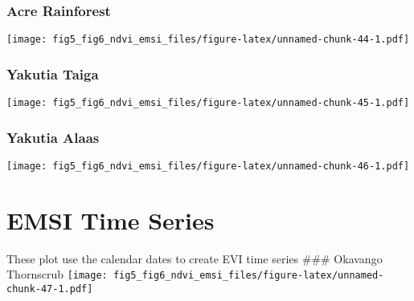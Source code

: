 \documentclass[
]{article}
\begin{document}
\hypertarget{htmlwidget-ff9585b107a18dc5c83f}{}
\begin{plotly}

\end{plotly}

\hypertarget{acre-rainforest-2}{%
\subsubsection{Acre Rainforest}\label{acre-rainforest-2}}

\texttt{[image: fig5\_fig6\_ndvi\_emsi\_files/figure-latex/unnamed-chunk-44-1.pdf]}

\hypertarget{htmlwidget-0040ec9b5f36076c8a3b}{}
\begin{plotly}

\end{plotly}

\hypertarget{yakutia-taiga-2}{%
\subsubsection{Yakutia Taiga}\label{yakutia-taiga-2}}

\texttt{[image: fig5\_fig6\_ndvi\_emsi\_files/figure-latex/unnamed-chunk-45-1.pdf]}

\hypertarget{htmlwidget-43b13671f6137b6a7d40}{}
\begin{plotly}

\end{plotly}

\hypertarget{yakutia-alaas-2}{%
\subsubsection{Yakutia Alaas}\label{yakutia-alaas-2}}

\texttt{[image: fig5\_fig6\_ndvi\_emsi\_files/figure-latex/unnamed-chunk-46-1.pdf]}

\hypertarget{htmlwidget-fa614feb6b231bb2ba26}{}
\begin{plotly}

\end{plotly}

\hypertarget{emsi-time-series}{%
\section{EMSI Time Series}\label{emsi-time-series}}

These plot use the calendar dates to create EVI time series \#\#\#
Okavango Thornscrub
\texttt{[image: fig5\_fig6\_ndvi\_emsi\_files/figure-latex/unnamed-chunk-47-1.pdf]}
\end{document}
